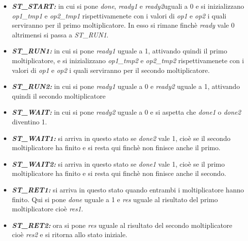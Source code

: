 \documentclass[]{IEEEtran}
\begin{document}
\begin{itemize}
    \item {\it\bf ST\_START:} in cui si pone {\it done}, {\it ready1} e {\it ready2}uguali a 0 e si inizializzano {\it op1\_tmp1} e {\it op2\_tmp1} rispettivamenete con i valori di {\it op1} e {\it op2} i quali serviranno per il primo moltiplicatore. In esso si rimane finchè {\it ready} vale 0 altrimensi si passa a {\it ST\_RUN1}.
    \item {\it\bf ST\_RUN1:} in cui si pone {\it ready1} uguale a 1, attivando quindi il primo moltiplicatore, e si inizializzano {\it op1\_tmp2} e {\it op2\_tmp2} rispettivamenete con i valori di {\it op1} e {\it op2} i quali serviranno per il secondo moltiplicatore.
    \item {\it\bf ST\_RUN2:} in cui si pone {\it ready1} uguale a 0 e {\it ready2} uguale a 1, attivando quindi il secondo moltiplicatore
    \item {\it\bf ST\_WAIT:} in cui si pone {\it ready2} uguale a 0 e si aspetta che {\it done1} o {\it done2} diventino 1.
    \item {\it\bf ST\_WAIT1:} si arriva in questo stato se {\it done2} vale 1, cioè se il secondo moltiplicatore ha finito e si resta qui finchè non finisce anche il primo.
    \item {\it\bf ST\_WAIT2:} si arriva in questo stato se {\it done1} vale 1, cioè se il primo moltiplicatore ha finito e si resta qui finchè non finisce anche il secondo.
    \item {\it\bf ST\_RET1:} si arriva in questo stato quando entrambi i moltiplicatore hanno finito. Qui si pone {\it done} uguale a 1 e {\it res} uguale al risultato del primo moltiplicatore cioè {\it res1}.
    \item {\it\bf ST\_RET2:} ora si pone {\it res} uguale al risultato del secondo moltiplicatore cioè {\it res2} e si ritorna allo stato iniziale.
\end{itemize}
\end{document}
